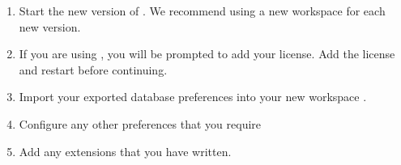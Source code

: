 \begin{enumerate}
\item Start the new version of \app{}. We recommend using a new workspace for each new version. 
\item If you are using \gd{}, you will be prompted to add your license. Add the license and restart \gd{} before continuing. 
\item Import your exported database preferences into your new workspace  .
\item Configure any other preferences that you require
\item Add any extensions that you have written. 
\end{enumerate}
